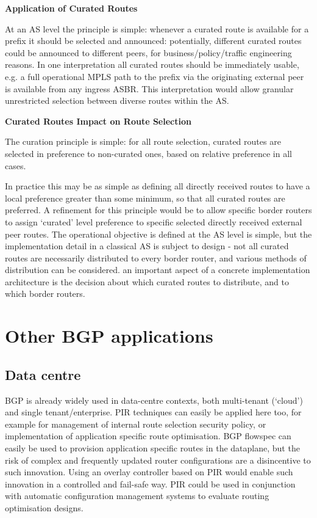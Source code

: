 \textbf{Application of Curated Routes}

At an AS level the principle is simple: whenever a curated route is available for a prefix it should be selected and announced: potentially, different curated routes could be announced to different peers, for business/policy/traffic engineering reasons. In one interpretation all curated routes should be immediately usable, e.g. a full operational MPLS path to the prefix via the originating external peer is available from any ingress ASBR. This interpretation would allow granular unrestricted selection between diverse routes within the AS.

\textbf{Curated Routes Impact on Route Selection}

The curation principle is simple: for all route selection, curated routes are selected in preference to non-curated ones, based on relative preference in all cases.

In practice this may be as simple as defining all directly received routes to have a local preference greater than some minimum, so that all curated routes are preferred. A refinement for this principle would be to allow specific border routers to assign ‘curated’ level preference to specific selected directly received external peer routes. The operational objective is defined at the AS level is simple, but the implementation detail in a classical AS is subject to design - not all curated routes are necessarily distributed to every border router, and various methods of distribution can be considered. an important aspect of a concrete implementation architecture is the decision about which curated routes to distribute, and to which border routers.

\section{Other BGP applications}

\subsection{Data centre}

BGP is already widely used in data-centre contexts, both multi-tenant (‘cloud’) and single tenant/enterprise. PIR techniques can easily be applied here too, for example for management of internal route selection security policy, or implementation of application specific route optimisation. BGP flowspec can easily be used to provision application specific routes in the dataplane, but the risk of complex and frequently updated router configurations are a disincentive to such innovation. Using an overlay controller based on PIR would enable such innovation in a controlled and fail-safe way. PIR could be used in conjunction with automatic configuration management systems to evaluate routing optimisation designs.

